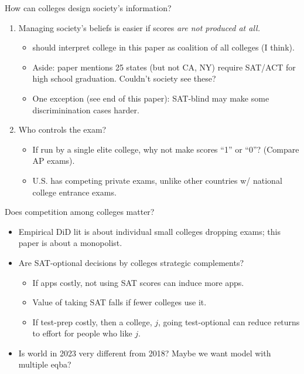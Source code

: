 \documentclass[11pt, aspectratio=169]{beamer}
\theoremstyle{plain}
\theoremstyle{plain}
\theoremstyle{plain}
\theoremstyle{plain}
\begin{document}
\begin{frame}{How can colleges design society's information?}
    \begin{enumerate}
       \item Managing society's beliefs is easier if scores \emph{are not produced at all.} \pause
        \begin{itemize}
            \item should interpret college in this paper as coalition of all colleges (I think). \pause %
            \item Aside: paper mentions 25 states (but not CA, NY) require SAT/ACT for high school graduation.  Couldn't society see these? \pause
            \item One exception (see end of this paper): SAT-blind may make some discriminination cases harder. \pause
        \end{itemize}

    \item Who controls the exam? \pause
        \begin{itemize}
            \item If run by a single elite college, why not make scores ``1'' or ``0''?  (Compare AP exams). \pause
            \item U.S. has competing private exams, unlike other countries w/ national college entrance exams.
        \end{itemize}
    \end{enumerate}
\end{frame}

\begin{frame}{Does competition among colleges matter?}
\begin{itemize}
    \item Empirical DiD lit is about individual small colleges dropping exams; this paper is about a monopolist. \pause
    \item Are SAT-optional decisions by colleges strategic complements? \pause
    \begin{itemize}
        \item If apps costly, not using SAT scores can induce more apps. \pause
        \item Value of taking SAT falls if fewer colleges use it. \pause
        \item If test-prep costly, then a college, $j$, going test-optional can reduce returns to effort for people who like $j$. \pause
    \end{itemize}
    \item Is world in 2023 very different from 2018? Maybe we want model with multiple eqba?
\end{itemize}
\end{frame}
\end{document}
